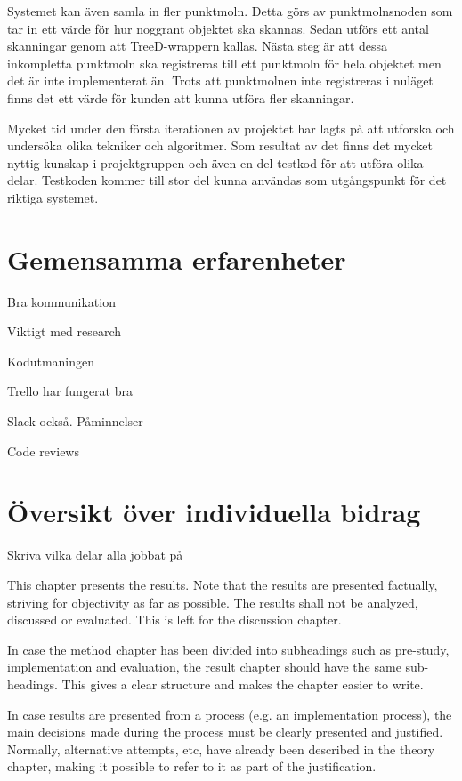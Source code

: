 Systemet kan även samla in fler punktmoln. Detta görs av punktmolnsnoden som tar in ett värde för hur noggrant objektet ska skannas. Sedan utförs ett antal skanningar genom att TreeD-wrappern kallas. Nästa steg är att dessa inkompletta punktmoln ska registreras till ett punktmoln för hela objektet men det är inte implementerat än. Trots att punktmolnen inte registreras i nuläget finns det ett värde för kunden att kunna utföra fler skanningar.

Mycket tid under den första iterationen av projektet har lagts på att utforska och undersöka olika tekniker och algoritmer. Som resultat av det finns det mycket nyttig kunskap i projektgruppen och även en del testkod för att utföra olika delar. Testkoden kommer till stor del kunna användas som utgångspunkt för det riktiga systemet.


\section{Gemensamma erfarenheter}

Bra kommunikation

Viktigt med research

Kodutmaningen

Trello har fungerat bra

Slack också. Påminnelser

Code reviews


\section{Översikt över individuella bidrag}

Skriva vilka delar alla jobbat på

This chapter presents the results. Note that the results are presented
factually, striving for objectivity as far as possible.  The results
shall not be analyzed, discussed or evaluated.  This is left for the
discussion chapter.

In case the method chapter has been divided into subheadings such as
pre-study, implementation and evaluation, the result chapter should
have the same sub-headings. This gives a clear structure and makes the
chapter easier to write.

In case results are presented from a process (e.g. an implementation
process), the main decisions made during the process must be clearly
presented and justified. Normally, alternative attempts, etc, have
already been described in the theory chapter, making it possible to
refer to it as part of the justification.

